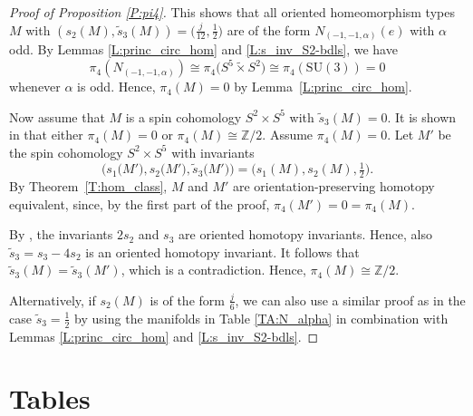 \documentclass[10pt,a4paper]{amsart}
\numberwithin{equation}{section}
\theoremstyle{definition}
\numberwithin{table}{section}
\newcommand{\Z}{\mathbb{Z}}
\newcommand{\ttimes}{\mathrel{\widetilde{\times} }}
\begin{document}
\begin{proof}[Proof of Proposition \ref{P:pi4}]
	
	
	This shows that all oriented homeomorphism types $M$ with $(s_2(M),\tilde{s}_3(M))=\bigl(\frac{j}{12},\frac{1}{2}\bigr)$ are of the form $N_{(-1,-1,\alpha)}(e)$ with $\alpha$ odd. By Lemmas \ref{L:princ_circ_hom} and \ref{L:s_inv_S2-bdls}, we have \[\pi_4(N_{(-1,-1,\alpha)})\cong \pi_4\bigl(S^5\ttimes S^2\bigr)\cong \pi_4(\mathrm{SU}(3))=0\] whenever $\alpha$ is odd. Hence, $\pi_4(M)=0$ by Lemma~\ref{L:princ_circ_hom}.
	
	Now assume that $M$ is a spin cohomology $S^2\times S^5$ with $\tilde{s}_3(M)=0$. It is shown in \cite[p. 471]{Kr98} that either $\pi_4(M)=0$ or $\pi_4(M)\cong\Z/2$. Assume $\pi_4(M)=0$. Let $M'$ be the spin cohomology $S^2\times S^5$ with invariants
	\[ \big(s_1\big(M'\big),s_2\big(M'\big),\tilde{s}_3\big(M'\big)\big)=\bigl(s_1(M),s_2(M),\tfrac{1}{2}\bigr). \]
	By Theorem~\ref{T:hom_class}, $M$ and $M'$ are orientation-preserving homotopy equivalent, since, by the first part of the proof, $\pi_4(M')=0=\pi_4(M)$.
	
	By \cite[Corollary 4.3]{EM16}, the invariants $2s_2$ and $s_3$ are oriented homotopy invariants. Hence, also $\tilde{s}_3=s_3-4s_2$ is an oriented homotopy invariant. It follows that $\tilde{s}_3(M)=\tilde{s}_3(M')$, which is a contradiction. Hence, $\pi_4(M)\cong\Z/2$.
	
	Alternatively, if $s_2(M)$ is of the form $\frac{j}{6}$, we can also use a similar proof as in the case $\tilde{s}_3=\frac{1}{2}$ by using the manifolds in Table \ref{TA:N_alpha} in combination with Lemmas \ref{L:princ_circ_hom} and \ref{L:s_inv_S2-bdls}.
\end{proof}

\appendix

\section{Tables}\label{S:Tables}
\end{document}
